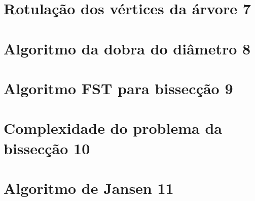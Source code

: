 \documentclass[a4paper,12pt]{article}
\begin{document}
\newpage

\section {Rotulação dos vértices da árvore 7}


\section {Algoritmo da dobra do diâmetro 8}


\section {Algoritmo FST para bissecção 9}



\section {Complexidade do problema da bissecção 10}



\section {Algoritmo de Jansen 11}



\end{document}
